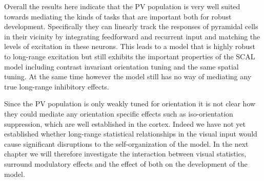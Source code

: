Overall the results here indicate that the PV population is very well
suited towards mediating the kinds of tasks that are important both
for robust development. Specifically they can linearly track the
responses of pyramidal cells in their vicinity by integrating
feedforward and recurrent input and matching the levels of excitation
in these neurons. This leads to a model that is highly robust to
long-range excitation but still exhibits the important properties of
the SCAL model including contrast invariant orientation tuning and the
same spatial tuning. At the same time however the model still has no
way of mediating any true long-range inhibitory effects.

Since the PV population is only weakly tuned for orientation it is not
clear how they could mediate any orientation specific effects such as
iso-orientation suppression, which are well established in the
cortex. Indeed we have not yet established whether long-range
statistical relationships in the visual input would cause significant
disruptions to the self-organization of the model. In the next chapter
we will therefore investigate the interaction between visual
statistics, surround modulatory effects and the effect of both on the
development of the model.
